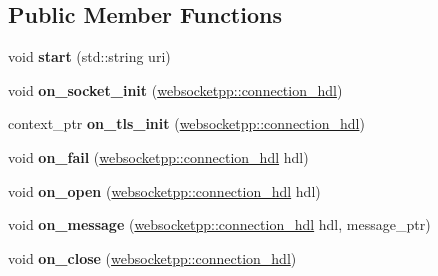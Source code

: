 \subsection*{Public Member Functions}
\begin{DoxyCompactItemize}
\item 
void {\bfseries start} (std\+::string uri)\hypertarget{classperftest_afa86f15f51139add01d21a1cc1b42d8a}{}\label{classperftest_afa86f15f51139add01d21a1cc1b42d8a}

\item 
void {\bfseries on\+\_\+socket\+\_\+init} (\hyperlink{namespacewebsocketpp_a6b3d26a10ee7229b84b776786332631d}{websocketpp\+::connection\+\_\+hdl})\hypertarget{classperftest_aca420618efac42bcafa8f582fc80584b}{}\label{classperftest_aca420618efac42bcafa8f582fc80584b}

\item 
context\+\_\+ptr {\bfseries on\+\_\+tls\+\_\+init} (\hyperlink{namespacewebsocketpp_a6b3d26a10ee7229b84b776786332631d}{websocketpp\+::connection\+\_\+hdl})\hypertarget{classperftest_a9acaf6688b55a4c341609f36a3daf47a}{}\label{classperftest_a9acaf6688b55a4c341609f36a3daf47a}

\item 
void {\bfseries on\+\_\+fail} (\hyperlink{namespacewebsocketpp_a6b3d26a10ee7229b84b776786332631d}{websocketpp\+::connection\+\_\+hdl} hdl)\hypertarget{classperftest_aa3802566f897c99564008e301a56fc99}{}\label{classperftest_aa3802566f897c99564008e301a56fc99}

\item 
void {\bfseries on\+\_\+open} (\hyperlink{namespacewebsocketpp_a6b3d26a10ee7229b84b776786332631d}{websocketpp\+::connection\+\_\+hdl} hdl)\hypertarget{classperftest_a55d1e404c7a1e57b27dbb9b16cd72fbc}{}\label{classperftest_a55d1e404c7a1e57b27dbb9b16cd72fbc}

\item 
void {\bfseries on\+\_\+message} (\hyperlink{namespacewebsocketpp_a6b3d26a10ee7229b84b776786332631d}{websocketpp\+::connection\+\_\+hdl} hdl, message\+\_\+ptr)\hypertarget{classperftest_a7806f56e172fe624849f4df473b1bb18}{}\label{classperftest_a7806f56e172fe624849f4df473b1bb18}

\item 
void {\bfseries on\+\_\+close} (\hyperlink{namespacewebsocketpp_a6b3d26a10ee7229b84b776786332631d}{websocketpp\+::connection\+\_\+hdl})\hypertarget{classperftest_a3394af04525712135cd6795c4778b882}{}\label{classperftest_a3394af04525712135cd6795c4778b882}

\end{DoxyCompactItemize}


